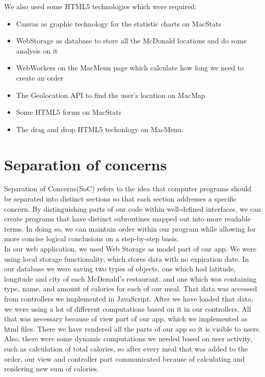 \documentclass[12pt]{article}
\begin{document}
    \noindent We also used some HTML5 technologies which were required:\\
    \begin{itemize}
        \item Canvas as graphic technology for the statistic charts on MacStats
        \item WebStorage as database to store all the McDonald locations and do some analysis on it
        \item WebWorkers on the MacMenu page which calculate how long we need to create an order
        \item The Geolocation API to find the user's location on MacMap
        \item Some HTML5 forms on MacStats
        \item The drag and drop HTML5 techonlogy on MacMenu.
    \end{itemize}


    {\color{color_section}\section{Separation of concerns}}

    \noindent Separation of Concerns(SoC) refers to the idea that computer programs should be separated into distinct sections so that each section addresses a specific concern. By distinguishing parts of our code within well-defined interfaces, we can create programs that have distinct subroutines mapped out into more readable terms. In doing so, we can maintain order within our program while allowing for more concise logical conclusions on a step-by-step basis. \\
   
    \noindent In our web application, we used Web Storage as model part of our app. We were using local storage functionality, which stores data with no expiration date. In our database we were saving two types of objects, one which had latitude, longitude and city of each McDonald's restaurant, and one which was containing type, name, and amount of calories for each of our meal. That data was accessed from controllers we implemented in JavaScript. After we have loaded that data, we were using a lot of different computations based on it in our controllers. All that was necessary because of view part of our app, which we implemented as html files. There we have rendered all the parts of our app so it is visible to users. Also, there were some dynamic computations we needed based on user activity, such as calculation of total calories, so after every meal that was added to the order, our view and controller part communicated because of calculating and rendering new sum of calories.\\
\end{document}
